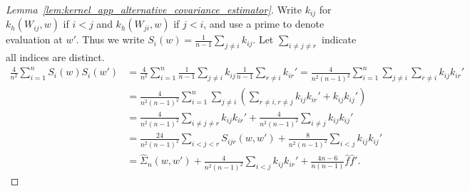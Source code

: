 \documentclass[11pt,lof]{puthesis}
\theoremstyle{break}
\theoremstyle{proof}
\newtheorem{proof}{Proof}
\begin{document}
\begin{proof}[Lemma~\ref{lem:kernel_app_alternative_covariance_estimator}]

Write $k_{i j}$ for $k_h(W_{i j},w)$
if $i<j$ and $k_h(W_{j i},w)$ if $j<i$,
and use a prime to denote evaluation at $w'$.
Thus we write $S_i(w) = \frac{1}{n-1} \sum_{j \neq i} k_{i j}$.
Let $\sum_{i \neq j \neq r}$ indicate all indices are distinct.
%
\begin{align*}
\frac{4}{n^2}
\sum_{i=1}^n
S_i(w) S_i(w')
&=
\frac{4}{n^2}
\sum_{i=1}^n
\frac{1}{n-1}
\sum_{j \neq i}
k_{i j}
\frac{1}{n-1}
\sum_{r \neq i}
k_{i r}'
=
\frac{4}{n^2(n-1)^2}
\sum_{i=1}^n
\sum_{j \neq i}
\sum_{r \neq i}
k_{i j}
k_{i r}' \\
&=
\frac{4}{n^2(n-1)^2}
\sum_{i=1}^n
\sum_{j \neq i}
\left(
\sum_{r \neq i, r \neq j}
k_{i j}
k_{i r}'
+ k_{i j}
k_{i j}'
\right) \\
&=
\frac{4}{n^2(n-1)^2}
\sum_{i \neq j \neq r}
k_{i j}
k_{i r}'
+ \frac{4}{n^2(n-1)^2}
\sum_{i \neq j}
k_{i j}
k_{i j}' \\
&=
\frac{24}{n^2(n-1)^2}
\sum_{i < j < r}
S_{i j r}(w,w')
+ \frac{8}{n^2(n-1)^2}
\sum_{i < j}
k_{i j}
k_{i j}' \\
&=
\hat \Sigma_n(w,w')
+ \frac{4}{n^2(n-1)^2}
\sum_{i < j}
k_{i j}
k_{i r}'
+ \frac{4n-6}{n(n-1)}
\hat f
\hat f'.
\end{align*}
%
\end{proof}
\end{document}
